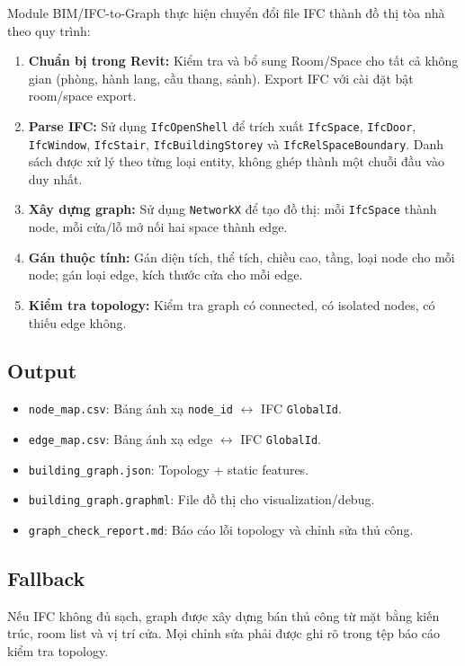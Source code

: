 Module BIM/IFC-to-Graph thực hiện chuyển đổi file IFC thành đồ thị tòa nhà theo quy trình:

\begin{enumerate}
  \item \textbf{Chuẩn bị trong Revit:} Kiểm tra và bổ sung Room/Space cho tất cả không gian (phòng, hành lang, cầu thang, sảnh). Export IFC với cài đặt bật room/space export.
  \item \textbf{Parse IFC:} Sử dụng \texttt{IfcOpenShell} để trích xuất \texttt{IfcSpace}, \texttt{IfcDoor}, \texttt{IfcWindow}, \texttt{IfcStair}, \texttt{IfcBuildingStorey} và \texttt{IfcRelSpaceBoundary}. Danh sách được xử lý theo từng loại entity, không ghép thành một chuỗi đầu vào duy nhất.
  \item \textbf{Xây dựng graph:} Sử dụng \texttt{NetworkX} để tạo đồ thị: mỗi \texttt{IfcSpace} thành node, mỗi cửa/lỗ mở nối hai space thành edge.
  \item \textbf{Gán thuộc tính:} Gán diện tích, thể tích, chiều cao, tầng, loại node cho mỗi node; gán loại edge, kích thước cửa cho mỗi edge.
  \item \textbf{Kiểm tra topology:} Kiểm tra graph có connected, có isolated nodes, có thiếu edge không.
\end{enumerate}

\subsection{Output}

\begin{itemize}
  \item \texttt{node\_map.csv}: Bảng ánh xạ \texttt{node\_id} $\leftrightarrow$ IFC \texttt{GlobalId}.
  \item \texttt{edge\_map.csv}: Bảng ánh xạ edge $\leftrightarrow$ IFC \texttt{GlobalId}.
  \item \texttt{building\_graph.json}: Topology + static features.
  \item \texttt{building\_graph.graphml}: File đồ thị cho visualization/debug.
  \item \texttt{graph\_check\_report.md}: Báo cáo lỗi topology và chỉnh sửa thủ công.
\end{itemize}

\subsection{Fallback}

Nếu IFC không đủ sạch, graph được xây dựng bán thủ công từ mặt bằng kiến trúc, room list và vị trí cửa. Mọi chỉnh sửa phải được ghi rõ trong tệp báo cáo kiểm tra topology.

